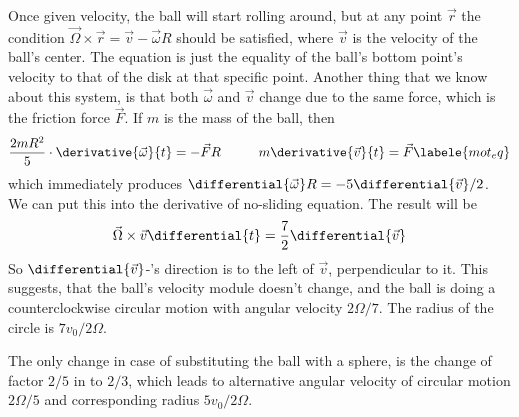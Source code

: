 Once given velocity, the ball will start rolling around,
but at any point $\vec{r}$ the condition
$\vec{\Omega} \times \vec{r} = \vec{v} - \vec{\omega} R$
should be satisfied,
where $\vec{v}$ is the velocity of the ball's center.
The equation is just the equality of the ball's bottom point's velocity
to that of the disk at that specific point.
Another thing that we know about this system,
is that both $\vec{\omega}$ and $\vec{v}$ change due to
the same force, which is the friction force $\vec{F}$.
If $m$ is the mass of the ball, then
\begin{equation}
    \frac{2 m R^2}{5} \cdot \derivative{\vec{\omega}}{t} = -\vec{F} R
    \hspace{1cm} m \derivative{\vec{v}}{t} = \vec{F}
    \labele{mot_eq}
\end{equation}
which immediately produces
$\differential{\vec{\omega}} R = -5 \differential{\vec{v}} / 2$.
We can put this into the derivative of no-sliding equation.
The result will be
\begin{equation}
    \vec{\Omega} \times \vec{v} \differential{t} =
    \frac{7}{2} \differential{\vec{v}}
\end{equation}
So $\differential{\vec{v}}$-'s direction is to the left of $\vec{v}$,
perpendicular to it.
This suggests, that the ball's velocity module doesn't change,
and the ball is doing a counterclockwise circular motion
with angular velocity $2 \Omega / 7$.
The radius of the circle is $7 v_0 / 2 \Omega$.

The only change in case of substituting the ball with a sphere,
is the change of factor $2/5$ in  to $2/3$,
which leads to alternative angular velocity of circular motion $2 \Omega / 5$
and corresponding radius $5 v_0 / 2 \Omega$.

